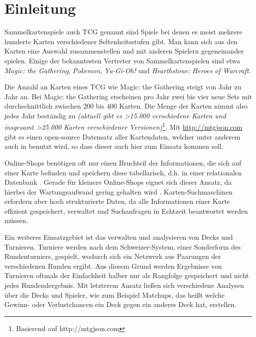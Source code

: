 \chapter{Einleitung}\label{ch:intro}

Sammelkartenspiele auch \ac{TCG} genannt sind Spiele bei denen es meist mehrere hunderte Karten verschiedener Seltenheitsstufen gibt. Man kann sich aus den Karten eine Auswahl zusammenstellen und mit anderen Spielern gegeneinander spielen. Einige der bekanntesten Vertreter von Sammelkartenspielen sind etwa \emph{Magic: the Gathering}, \emph{Pokemon}, \emph{Yu-Gi-Oh!} und \emph{Hearthstone: Heroes of Warcraft}. 

Die Anzahl an Karten eines \ac{TCG} wie Magic: the Gathering steigt von Jahr zu Jahr an. Bei Magic: the Gathering erscheinen pro Jahr zwei bis vier neue Sets mit durchschnittlich zwischen 200 bis 400 Karten. Die Menge der Karten nimmt also jedes Jahr beständig zu \emph{(aktuell gibt es >15.000 verschiedene Karten und insgesamt >25.000 Karten verschiedener Versionen)}\footnote{Basierend auf http://mtgjson.com}. Mit \url{http://mtgjson.com} gibt es einen open-source Datensatz aller Kartendaten, welcher unter anderem auch in \cite{finkpredicting, perkhounkovfinancial} benutzt wird, so dass dieser auch hier zum Einsatz kommen soll. 

Online-Shops benötigen oft nur einen Bruchteil der Informationen, die sich auf einer Karte befinden und speichern diese tabellarisch, d.h. in einer relationalen Datenbank \cite{johnson2013online}. Gerade für kleinere Online-Shops eignet sich dieser Ansatz, da hierbei der Wartungsaufwand gering gehalten wird \cite{johnson2013online}. Karten-Suchmaschinen erfordern aber hoch strukturierte Daten, da alle Informationen einer Karte effizient gespeichert, verwaltet und Suchanfragen in Echtzeit beantwortet werden müssen. 

Ein weiteres Einsatzgebiet ist das verwalten und analysieren von Decks und Turnieren. Turniere werden nach dem Schweizer-System, einer Sonderform des Rundenturniers, gespielt, wodurch sich ein Netzwerk aus Paarungen der verschiedenen Runden ergibt. Aus diesem Grund werden Ergebnisse von Turnieren oftmals der Einfachheit halber nur als Rangfolge gespeichert und nicht jedes Rundendergebnis. Mit letzterem Ansatz ließen sich verschiedene Analysen über die Decks und Spieler, wie  zum Beispiel Matchups, das heißt welche Gewinn- oder Verlustchancen ein Deck gegen ein anderes Deck hat, erstellen. 


